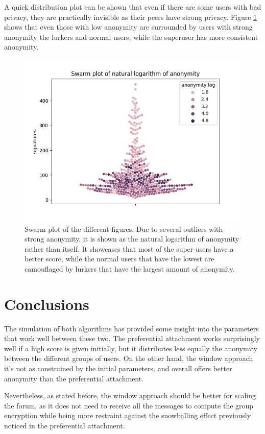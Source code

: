 \documentclass[11pt,congress]{ieeetran}
\begin{document}
A quick distribution plot can be shown that even if there are some users with bad privacy, they are practically invisible as their peers have strong privacy. Figure \ref{fig:swarm-anonlog} shows that even those with low anonymity are surrounded by users with strong anonymity the lurkers and normal users, while the superuser has more consistent anonymity.

\begin{figure}[htbp]
\centering
\includegraphics[width=.9\linewidth]{anonlog-swarm.png}
\caption{\label{fig:swarm-anonlog}Swarm plot of the different figures. Due to several outliers with strong anonymity, it is shown as the natural logarithm of anonymity rather than itself. It showcases that most of the super-users have a better score, while the normal users that have the lowest are camouflaged by lurkers that have the largest amount of anonymity.}
\end{figure}

\section{Conclusions}
\label{sec:org7b5276e}
The simulation of both algorithms has provided some insight into the parameters that work well between these two. The preferential attachment works surprisingly well if a high score is given initially, but it distributes less equally the anonymity between the different groups of users. On the other hand, the window approach it's not as constrained by the initial parameters, and overall offers better anonymity than the preferential attachment.

Nevertheless, as stated before, the window approach should be better for scaling the forum, as it does not need to receive all the messages to compute the group encryption while being more restraint against the snowballing effect previously noticed in the preferential attachment.
\end{document}
